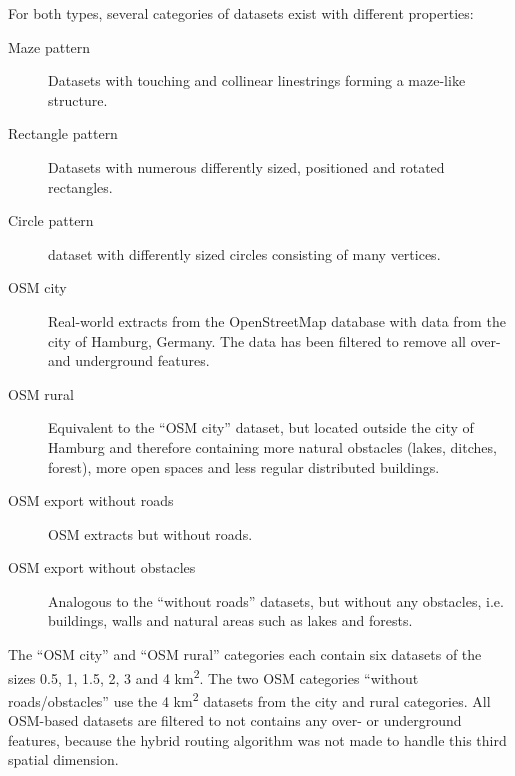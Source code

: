 		For both types, several categories of datasets exist with different properties:
		\begin{description}
			\item[Maze pattern] Datasets with touching and collinear linestrings forming a maze-like structure.
			\item[Rectangle pattern] Datasets with numerous differently sized, positioned and rotated rectangles.
			\item[Circle pattern] dataset with differently sized circles consisting of many vertices.
			\item[OSM city] Real-world extracts from the OpenStreetMap database with data from the city of Hamburg, Germany. The data has been filtered to remove all over- and underground features.
			\item[OSM rural] Equivalent to the \enquote{OSM city} dataset, but located outside the city of Hamburg and therefore containing more natural obstacles (lakes, ditches, forest), more open spaces and less regular distributed buildings.
			\item[OSM export without roads] OSM extracts but without roads.
			\item[OSM export without obstacles] Analogous to the \enquote{without roads} datasets, but without any obstacles, i.e. buildings, walls and natural areas such as lakes and forests.
		\end{description}
		The \enquote{OSM city} and \enquote{OSM rural} categories each contain six datasets of the sizes 0.5, 1, 1.5, 2, 3 and 4 km\textsuperscript{2}.
		The two OSM categories \enquote{without roads/obstacles} use the 4 km\textsuperscript{2} datasets from the city and rural categories.
		All OSM-based datasets are filtered to not contains any over- or underground features, because the hybrid routing algorithm was not made to handle this third spatial dimension.
		
